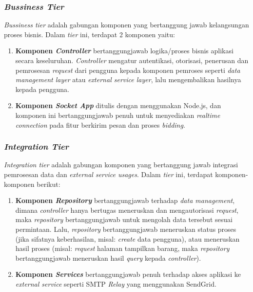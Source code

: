 	\subsubsection{\textit{Bussiness Tier}}
	\textit{Bussiness tier} adalah gabungan komponen yang bertanggung jawab kelangsungan proses bisnis. Dalam \textit{tier} ini, terdapat 2 komponen yaitu:
	\begin{enumerate}
		\item \textbf{Komponen \textit{Controller}} bertanggungjawab logika/proses bisnis aplikasi secara keseluruhan. \textit{Controller} mengatur autentikasi, otorisasi, penerusan dan pemrosesan \textit{request} dari pengguna kepada komponen pemroses seperti \textit{data management layer} atau \textit{external service layer}, lalu mengembalikan hasilnya kepada pengguna.
		\item \textbf{Komponen \textit{Socket App}}  ditulis dengan menggunakan Node.js, dan komponen ini bertanggungjawab penuh untuk menyediakan \textit{realtime connection} pada fitur berkirim pesan dan proses \textit{bidding}.
	\end{enumerate}
	
	\subsubsection{\textit{Integration Tier}}
	\textit{Integration tier} adalah gabungan komponen yang bertanggung jawab integrasi pemrosesan data dan \textit{external service usages}. Dalam \textit{tier} ini, terdapat komponen-komponen berikut:
	\begin{enumerate}
		\item \textbf{Komponen \textit{Repository}} bertanggungjawab terhadap \textit{data management}, dimana \textit{controller} hanya bertugas meneruskan dan mengautorisasi \textit{request}, maka \textit{repository} bertanggungjawab untuk mengolah data tersebut sesuai permintaan. Lalu, \textit{repository} bertanggungjawab meneruskan status proses (jika sifatnya keberhasilan, misal: \textit{create} data pengguna), atau meneruskan hasil proses (misal: \textit{request} halaman tampilkan barang, maka \textit{repository} bertanggungjawab meneruskan hasil \textit{query} kepada \textit{controller}). \\
		\item \textbf{Komponen \textit{Services}} bertanggungjawab penuh terhadap akses aplikasi ke \textit{external service} seperti SMTP\textit{ Relay} yang menggunakan SendGrid.
	\end{enumerate}

